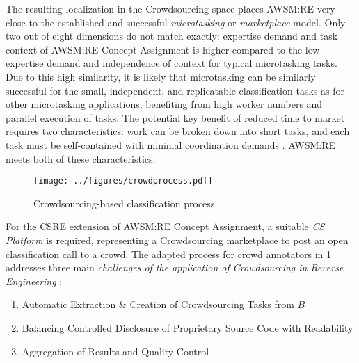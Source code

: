 The resulting localization in the \gls{Crowdsourcing} space places AWSM:RE very close to the established and successful \emph{microtasking} \autocite{Latoza2016} or \emph{marketplace} \autocite{Daniel2018CrowdsourcingQuality} model.
Only two out of eight dimensions do not match exactly: expertise demand and task context of AWSM:RE \gls{Concept Assignment} is higher compared to the low expertise demand and independence of context for typical microtasking tasks.
Due to this high similarity, it is likely that microtasking can be similarly successful for the small, independent, and replicatable classification tasks as for other microtasking applications, benefiting from high worker numbers and parallel execution of tasks.
The potential key benefit of reduced time to market requires two characteristics: work can be broken down into short tasks, and each task must be self-contained with minimal coordination demands \autocite{Latoza2016}.
AWSM:RE meets both of these characteristics.

\begin{figure}[h!]
\hypertarget{fig:crowdprocess}{%
\centering
\texttt{[image: ../figures/crowdprocess.pdf]}
\caption[Crowdsourcing-based classification process]{Crowdsourcing-based classification process\\ \autocite[adapted from][]{Heil2019CSRECCIS}}\label{fig:crowdprocess}
}
\end{figure}

For the CSRE extension \autocite{Heil2019CSRECCIS} of AWSM:RE \gls{Concept Assignment}, a suitable \emph{CS Platform} is required, representing a \gls{Crowdsourcing} marketplace to post an open classification call to a crowd.
The adapted process for crowd annotators in \cref{fig:crowdprocess} addresses three main \emph{challenges of the application of \gls{Crowdsourcing} in \gls{Reverse Engineering}} \autocite{Heil2019CSRECCIS}:

\begin{enumerate}
\def\labelenumi{\arabic{enumi}.}
\tightlist
\item
  Automatic Extraction \& Creation of \gls{Crowdsourcing} Tasks from \(B\)
\item
  Balancing Controlled Disclosure of Proprietary Source Code with Readability
\item
  Aggregation of Results and Quality Control
\end{enumerate}

